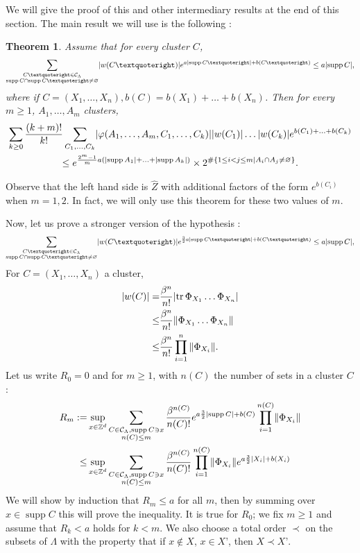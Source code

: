 \documentclass{article}
\DeclarePairedDelimiter\abs{\lvert}{\rvert}
\DeclarePairedDelimiter\norm{\lVert}{\rVert}
\newtheorem{thm}{Theorem}[section]
\DeclareMathOperator{\tr}{tr}
\DeclareMathOperator{\supp}{supp}
\begin{document}
We will give the proof of this and other intermediary results at the end of this section.
The main result we will use is the following : 
\begin{thm}
    \label{thm:corellation_estimates}
    Assume that for every cluster $C$,$$
        \sum_{\substack{C’\in \mathcal C_\Lambda\\\supp C\cap \supp C’\neq\varnothing}}\abs{w(C’)}e^{a\abs{\supp C’}+b(C’)}\leq a\abs{\supp C},
    $$
    where if $C=(X_1,\ldots,X_n),b(C)=b(X_1)+\ldots+b(X_n)$.
    Then for every $m\geq 1$, $A_1,\ldots ,A_m$ clusters,
    \begin{multline*}
        \sum_{k\geq 0}\frac{(k+m)!}{k!}\sum_{C_1,\ldots,C_k}\abs{\varphi(A_1,\ldots,A_m,C_1,\ldots,C_k)}\abs{w(C_1)}\ldots \abs{w(C_k)}e^{b(C_1)+\ldots+b(C_k)}\\
            \leq e^{\frac{2^m-1}{m}a(\abs{\supp A_1}+\ldots+\abs{\supp A_k})}\times 2^{\#\{1\leq i<j\leq m\mid A_i\cap A_j\neq\varnothing\}}.
        \end{multline*}
\end{thm}
Observe that the left hand side is $\hat Z$ with additional factors of the form $e^{b(C_i)}$ when $m=1,2$. 
In fact, we will only use this theorem for these two values of $m$.

 Now, let us prove a stronger version of the hypothesis :
 \begin{equation}
     \label{eq:sum_over_C_w_leq_a_suppC}
         \sum_{\substack{C’\in \mathcal C_\Lambda\\\supp C\cap \supp C’\neq\varnothing}}\abs{w(C’)}e^{\frac 3 2 a\abs{\supp C’}+b(C’)}\leq a\abs{\supp C},
 \end{equation}
 For $C=(X_1,\ldots,X_n)$ a cluster,
 \begin{align*}
|w(C)|=&\frac{\beta^{n}}{n!}\abs{\tr\Phi_{X_1}\ldots\Phi_{X_n}}\\
\leq& \frac{\beta^{n}}{n!}\norm{\Phi_{X_1}\ldots\Phi_{X_n}}\\
\leq &\frac{\beta^{n}}{n!}\prod_{i=1}^n{\norm{\Phi_{X_i}}}.
 \end{align*}
 Let us write $R_0=0$ and for $m\geq 1$, with $n(C)$ the number of sets in a cluster $C$ :\begin{align*}
 R_m:=&\sup_{x\in \mathbb Z^d}\sum_{\substack{C\in\mathcal C_\Lambda,\supp C\ni x\\n(C)\leq m}}\frac{\beta^{n(C)}}{n(C)!}e^{a\frac 3 2 \abs {\supp C} + b(C)}\prod_{i=1}^{n(C)}\norm{\Phi_{X_i}}\\
 \leq& \sup_{x\in \mathbb Z^d}\sum_{\substack{C\in\mathcal C_\Lambda,\supp C\ni x\\n(C)\leq m}}\frac{\beta^{n(C)}}{n(C)!}\prod_{i=1}^{n(C)}\norm{\Phi_{X_i}}e^{a\frac 3 2 \abs {X_i} + b(X_i)}
\end{align*}
 We will show by induction that $R_m \leq a$ for all $m$, then by summing over $x\in \supp C$ this will prove the inequality.
 It is true for $R_0$; we fix $m\geq 1$
 and assume that $R_k<a$ holds for $k<m$.
We also choose a total order $\prec$ on the subsets of $\Lambda$ with the property that if $x\notin X$, $x\in X’$, then $X\prec X’$.
\end{document}
